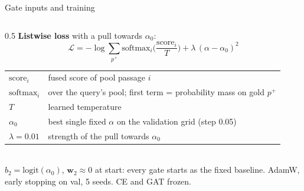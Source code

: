 \documentclass[aspectratio=169,11pt]{beamer}
\makeatletter
\newcommand{\gloss}[1]{\begingroup\footnotesize\renewcommand{\arraystretch}{1.18}\begin{tabular}{@{}>{\color{ctx}}l@{\hspace{0.6em}}>{\raggedright\arraybackslash}p{#1}@{}}}
\newcommand{\glossend}{\end{tabular}\endgroup}
\newcommand{\ssem}{s_{\mathrm{sem}}}
\newcommand{\sctx}{s_{\mathrm{ctx}}}
\makeatother
\begin{document}
\begin{frame}{Gate inputs and training}
\begin{columns}[T]
\begin{column}{0.5\textwidth}
\textbf{Listwise loss} with a pull towards $\alpha_0$:
\[\mathcal L=-\log\sum_{p^+}\mathrm{softmax}_i\Big(\frac{\mathrm{score}_i}{T}\Big)+\lambda\,(\alpha-\alpha_0)^2\]
\gloss{4.4cm}
$\mathrm{score}_i$ & fused score of pool passage $i$\\
$\mathrm{softmax}_i$ & over the query's pool; first term = probability mass on gold $p^+$\\
$T$ & learned temperature\\
$\alpha_0$ & best single fixed $\alpha$ on the validation grid (step 0.05)\\
$\lambda=0.01$ & strength of the pull towards $\alpha_0$\\
\glossend\\[0.15cm]
{\scriptsize\color{muted}$b_2=\mathrm{logit}(\alpha_0)$, $\mathbf w_2\approx0$ at start: every gate starts as the fixed baseline. AdamW, early stopping on val, 5 seeds. CE and GAT frozen.}
\end{column}
\end{columns}
\end{frame}
\end{document}

